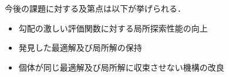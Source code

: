 \documentclass[a4j,11pt]{jarticle}
\def\proposed{DNRBA}
\begin{document}
今後の課題に対する及第点は以下が挙げられる．
\begin{itemize}
  \item 勾配の激しい評価関数に対する局所探索性能の向上
  \item 発見した最適解及び局所解の保持
  \item 個体が同じ最適解及び局所解に収束させない機構の改良 
\end{itemize}
\end{document}
